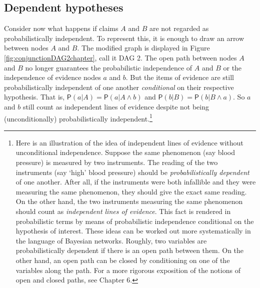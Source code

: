\documentclass[
  10pt,
  dvipsnames,enabledeprecatedfontcommands]{scrartcl}
\newcommand{\pr}[1]{\ensuremath{\mathsf{P}(#1)}}
\begin{document}
\hypertarget{dependent-hypotheses}{%
\subsection{Dependent hypotheses}\label{dependent-hypotheses}}

Consider now what happens if claims \(A\) and \(B\) are not regarded as
probabilistically independent. To represent this, it is enough to draw
an arrow between nodes \(A\) and \(B\). The modified graph is displayed
in Figure \ref{fig:conjunctionDAG2chapter}, call it \textsf{DAG 2}. The
open path between nodes \(A\) and \(B\) no longer guarantees the
probabilistic independence of \(A\) and \(B\) or the independence of
evidence nodes \(a\) and \(b\). But the items of evidence are still
probabilistically independent of one another \textit{conditional} on
their respective hypothesis. That is,
\(\pr{a \vert A}=\pr{a \vert A \wedge b}\) and
\(\pr{b \vert B}=\pr{b \vert B \wedge a}\). So \(a\) and \(b\) still
count as independent lines of evidence despite not being
(unconditionally) probabilistically independent.\footnote{Here is an
  illustration of the idea of independent lines of evidence without
  unconditional independence. Suppose the same phenomenon (say blood
  pressure) is measured by two instruments. The reading of the two
  instruments (say `high' blood pressure) should be
  \textit{probabilistically dependent} of one another. After all, if the
  instruments were both infallible and they were measuring the same
  phenomenon, they should give the exact same reading. On the other
  hand, the two instruments measuring the same phenomenon should count
  as \textit{independent lines of evidence}. This fact is rendered in
  probabilistic terms by means of probabilistic independence conditional
  on the hypothesis of interest. These ideas can be worked out more
  systematically in the language of Bayesian networks. Roughly, two
  variables are probabilistically dependent if there is an open path
  between them. On the other hand, an open path can be closed by
  conditioning on one of the variables along the path. For a more
  rigorous exposition of the notions of open and closed paths, see
  Chapter 6.} 
\end{document}
